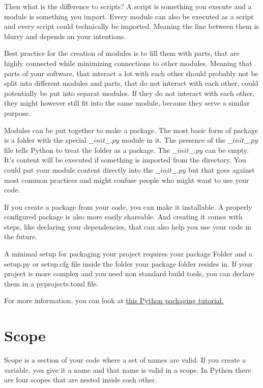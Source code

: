\documentclass{article}
\begin{document}
Then what is the difference to scripts?
A script is something you execute and a module is something you import.
Every module can also be executed as a script and every script could
technically be imported.
Meaning the line between them is blurry and depends on your intentions.

Best practice for the creation of modules is to fill them with parts, that are
highly connected while minimizing connections to other modules.
Meaning that parts of your software, that interact a lot with each other
should probably not be split into different modules and parts, that do not interact with
each other, could potentially be put into separat modules.
If they do not interact with each other, they might however still fit into
the same module, because they serve a similar purpose.

Modules can be put together to make a package.
The most basic form of package is a folder with the special $\_\_init\_\_.py$
module in it.
The presence of the $\_\_init\_\_.py$ file tells Python to treat the folder as a
package.
The $\_\_init\_\_.py$ can be empty.
It's content will be executed if something is imported from the directory.
You could put your module content directly into the $\_\_init\_\_.py$ but
that goes against most common practices and might confuse people
who might want to use your code.

If you create a package from your code, you can make it installable.
A properly configured package is also more easily shareable.
And creating it comes with steps, like declaring your dependencies, that
can also help you use your code in the future.

A minimal setup for packaging your project requires your package Folder and
a setup.py or setup.cfg file inside the folder your package folder resides in.
If your project is more complex and you need non standard build tools,
you can declare them in a pyprojects.toml file.

For more information, you can look at
\href{https://packaging.python.org/tutorials/packaging-projects/}{this Python packaging tutorial.}

\section{Scope}

Scope is a section of your code where a set of names are valid.
If you create a variable, you give it a name and that name is valid in a scope.
In Python there are four scopes that are nested inside each other.
\end{document}
